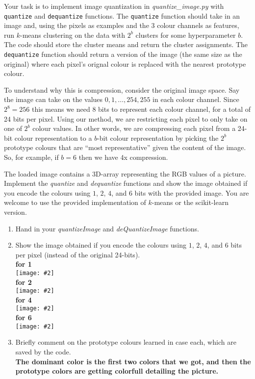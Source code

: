 \documentclass{article}
\def\blu#1{{\color{blu}#1}}
\newcommand{\fig}[2]{\texttt{[image: \#2]}}
\def\enum#1{\begin{enumerate}#1\end{enumerate}}
\begin{document}
Your task is to implement image quantization in \emph{quantize\_image.py} with \texttt{quantize} and \texttt{dequantize} functions. The \texttt{quantize} function should take in an image and, using the pixels as examples and the 3 colour channels as features, run $k$-means clustering on the data with $2^b$ clusters for some hyperparameter $b$. The code should store the cluster means and return the cluster assignments. The \texttt{dequantize} function should return a version of the image (the same size as the original) where each pixel's orignal colour is replaced with the nearest prototype colour.

To understand why this is compression, consider the original image space. Say the image can take on the values $0,1,\ldots,254,255$ in each colour channel. Since $2^8=256$ this means we need 8 bits to represent each colour channel, for a total of 24 bits per pixel. Using our method, we are restricting each pixel to only take on one of $2^b$ colour values. In other words, we are compressing each pixel from a 24-bit colour representation to a $b$-bit colour representation by picking the $2^b$ prototype colours that are ``most representative'' given the content of the image. So, for example, if $b=6$ then we have 4x compression.

The loaded image contains a 3D-array representing the RGB values of a picture.
\blu{Implement the \emph{quantize} and \emph{dequantize} functions and show the image
obtained if you encode the colours using $1$, $2$, $4$, and $6$ bits with the provided image.}
You are welcome to use the provided implementation of $k$-means or the scikit-learn version.


\blu{\enum{
\item Hand in your \emph{quantizeImage} and \emph{deQuantizeImage} functions.
\item Show the image obtained if you encode the colours using $1$, $2$, $4$, and $6$ bits per pixel (instead of the original 24-bits).\\
\textbf{for 1}\\
\fig{.49}{../figs/b_1_image.png}\\
\textbf{for 2}\\
\fig{.49}{../figs/b_2_image.png}\\
\textbf{for 4}\\
\fig{.49}{../figs/b_4_image.png}\\
\textbf{for 6}\\
\fig{.49}{../figs/b_6_image.png}\\
\item Briefly comment on the prototype colours learned in case each, which are saved by the code.\\
\textbf{The dominant color is the first two colors that we got, and then the prototype colors are getting colorfull detailing the picture.}
}}
\end{document}
